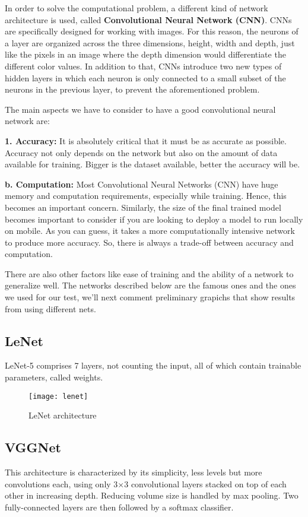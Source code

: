 \documentclass[../main.tex]{subfiles}
\begin{document}
In order to solve the computational problem, a different
kind of network architecture is used, called \textbf{Convolutional Neural Network (CNN)}. CNNs are specifically designed for
working with images. For this reason, the neurons of a layer
are organized across the three dimensions, height, width and
depth, just like the pixels in an image where the depth
dimension would differentiate the different color values. In
addition to that, CNNs introduce two new types of hidden
layers in which each neuron is only connected to a small
subset of the neurons in the previous layer, to prevent the
aforementioned problem. \cite{article}

The main aspects we have to consider to have a good convolutional neural network are:

\textbf{1. Accuracy:}
It is absolutely critical that it must be as accurate as possible. Accuracy not only depends on the network but also on the amount of data available for training. Bigger is the dataset available, better the accuracy will be.

\textbf{b. Computation:}
Most Convolutional Neural Networks (CNN) have huge memory and computation requirements, especially while training. Hence, this becomes an important concern. Similarly, the size of the final trained model becomes important to consider if you are looking to deploy a model to run locally on mobile. As you can guess, it takes a more computationally intensive network to produce more accuracy. So, there is always a trade-off between accuracy and computation.

There are also other factors like ease of training and the ability of a network to generalize well. The networks described below are the famous ones and the ones we used for our test, we'll next comment preliminary grapichs that show results from using different nets.

\subsection{LeNet}
LeNet-5 comprises 7 layers, not counting the input, all of which contain trainable parameters, called weights.
\begin{figure}[htbp] 
\centering 
\texttt{[image: lenet]}
\caption{LeNet architecture} 
\label{lenet} 
\end{figure}

\cite{Lecun}

\subsection{VGGNet}
This architecture is characterized by its simplicity, less levels but more convolutions each, using only 3×3 convolutional layers stacked on top of each other in increasing depth. Reducing volume size is handled by max pooling. Two fully-connected layers are then followed by a softmax classifier.
\end{document}
